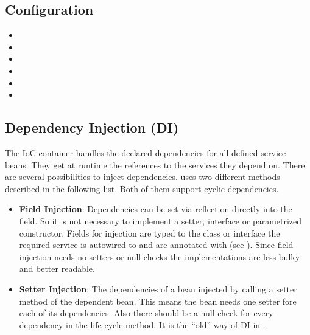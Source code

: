 \subsection{Configuration}
\begin{itemize}
	\item {}
	\item {}
	\item {}
	\item {}
	\item {}
	\item {}
\end{itemize}

\subsection{Dependency Injection (DI)}
\label{module:IoC:DependencyInjection}
The IoC container handles the declared dependencies for all defined service beans. They get at runtime the references to the services they depend on. There are several possibilities to inject dependencies. \AMBETH{} uses two different methods described in the following list. Both of them support cyclic dependencies.

\begin{itemize}
	\item \textbf{Field Injection}: Dependencies can be set via reflection directly into the field. So it is not necessary to implement a setter, interface or parametrized constructor. Fields for injection are typed to the class or interface the required service is autowired to and are annotated with  (see ). Since field injection needs no setters or null checks the implementations are less bulky and better readable.
	\item \textbf{Setter Injection}: The dependencies of a bean injected by calling a setter method of the dependent bean. This means the bean needs one setter fore each of its dependencies. Also there should be a null check for every dependency in the  life-cycle method. It is the ``old'' way of DI in \AMBETH.
\end{itemize}	


